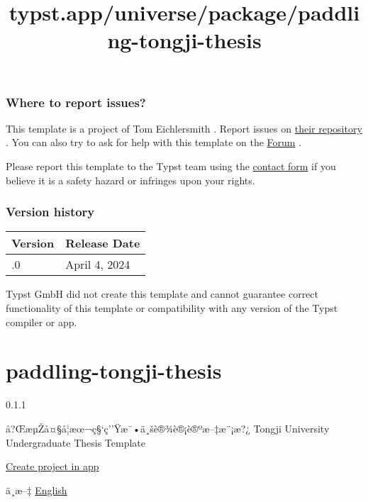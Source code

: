 \subsubsection{Where to report issues?}\label{where-to-report-issues}

This template is a project of Tom Eichlersmith . Report issues on
\href{https://github.com/tomeichlersmith/zen-zine}{their repository} .
You can also try to ask for help with this template on the
\href{https://forum.typst.app}{Forum} .

Please report this template to the Typst team using the
\href{https://typst.app/contact}{contact form} if you believe it is a
safety hazard or infringes upon your rights.

\label{versions}
\subsubsection{Version history}\label{version-history}

\begin{longtable}[]{@{}ll@{}}
\toprule\noalign{}
Version & Release Date \\
\midrule\noalign{}
\endhead
\bottomrule\noalign{}
\endlastfoot
0.1.0 & April 4, 2024 \\
\end{longtable}

Typst GmbH did not create this template and cannot guarantee correct
functionality of this template or compatibility with any version of the
Typst compiler or app.


\title{typst.app/universe/package/paddling-tongji-thesis}

\label{banner}
\label{template-thumbnail}

\section{paddling-tongji-thesis}\label{paddling-tongji-thesis}

{ 0.1.1 }

å?ŒæµŽå¤§å­¦æœ¬ç§`ç''Ÿæ¯•ä¸šè®¾è®¡è®ºæ--‡æ¨¡æ?¿ \textbar{} Tongji
University Undergraduate Thesis Template

\href{/app?template=paddling-tongji-thesis&version=0.1.1}{Create project
in app}

\label{readme}
ä¸­æ--‡ \textbar{}
\href{https://github.com/typst/packages/raw/main/packages/preview/paddling-tongji-thesis/0.1.1/README-EN.md}{English}

